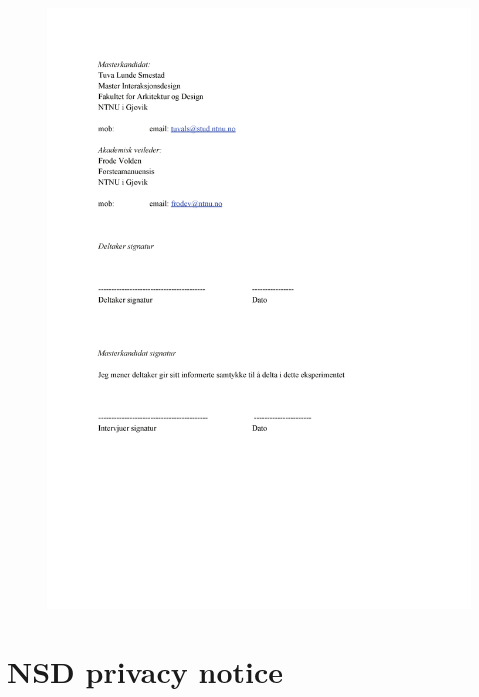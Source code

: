     \begin{figure}
        \centering
        \includegraphics[scale=0.8]{figures/samtykkex2.pdf}
    \end{figure}

\section{NSD privacy notice}
    \label{NSD}


